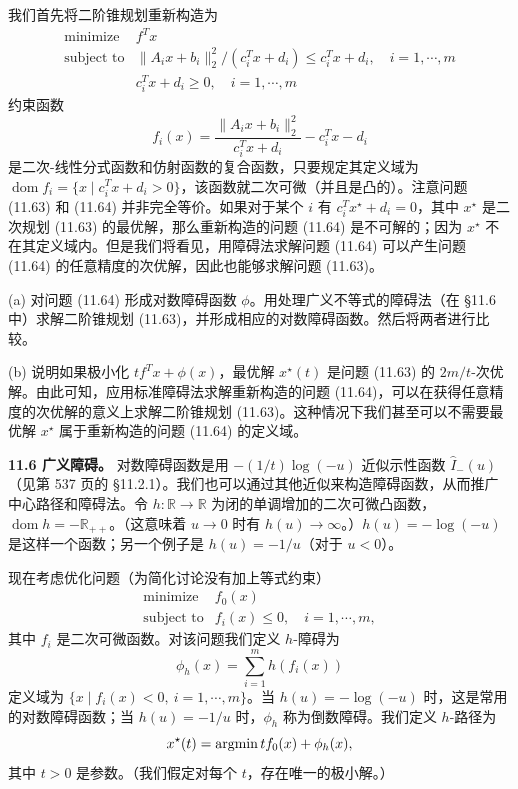 \documentclass[UTF8, 12pt, fontset=fandol, oneside]{ctexart}
\begin{document}
我们首先将二阶锥规划重新构造为
\begin{equation}
\begin{array}{ll}
\text{minimize} & f^Tx\\
\text{subject to} & \|A_ix+b_i\|_2^2/(c_i^Tx+d_i)\leq c_i^Tx+d_i,\quad i=1,\cdots,m\\
& c_i^Tx+d_i\geq 0,\quad i=1,\cdots,m
\end{array}
\tag{11.64}
\end{equation}
约束函数
\[
f_i(x)=\frac{\|A_ix+b_i\|_2^2}{c_i^Tx+d_i}-c_i^Tx-d_i
\]
是二次-线性分式函数和仿射函数的复合函数，只要规定其定义域为 $\operatorname{dom} f_i=\{x\mid c_i^Tx+d_i>0\}$，该函数就二次可微（并且是凸的）。注意问题 (11.63) 和 (11.64) 并非完全等价。如果对于某个 $i$ 有 $c_i^Tx^\star+d_i=0$，其中 $x^\star$ 是二次规划 (11.63) 的最优解，那么重新构造的问题 (11.64) 是不可解的；因为 $x^\star$ 不在其定义域内。但是我们将看见，用障碍法求解问题 (11.64) 可以产生问题 (11.64) 的任意精度的次优解，因此也能够求解问题 (11.63)。

(a) 对问题 (11.64) 形成对数障碍函数 $\phi$。用处理广义不等式的障碍法（在 \S11.6 中）求解二阶锥规划 (11.63)，并形成相应的对数障碍函数。然后将两者进行比较。

(b) 说明如果极小化 $tf^Tx+\phi(x)$，最优解 $x^\star(t)$ 是问题 (11.63) 的 $2m/t$-次优解。由此可知，应用标准障碍法求解重新构造的问题 (11.64)，可以在获得任意精度的次优解的意义上求解二阶锥规划 (11.63)。这种情况下我们甚至可以不需要最优解 $x^\star$ 属于重新构造的问题 (11.64) 的定义域。

\noindent\textbf{11.6 广义障碍。} 对数障碍函数是用 $-(1/t)\log(-u)$ 近似示性函数 $\hat{I}_-(u)$（见第 537 页的 \S11.2.1）。我们也可以通过其他近似来构造障碍函数，从而推广中心路径和障碍法。令 $h:\mathbb{R}\to\mathbb{R}$ 为闭的单调增加的二次可微凸函数，$\operatorname{dom}h=-\mathbb{R}_{++}$。（这意味着 $u\to 0$ 时有 $h(u)\to\infty$。）$h(u)=-\log(-u)$ 是这样一个函数；另一个例子是 $h(u)=-1/u$（对于 $u<0$）。

现在考虑优化问题（为简化讨论没有加上等式约束）
\[
\begin{array}{ll}
\text{minimize} & f_0(x)\\
\text{subject to} & f_i(x)\leq 0,\quad i=1,\cdots,m,
\end{array}
\]
其中 $f_i$ 是二次可微函数。对该问题我们定义 $h$-障碍为
\[
\phi_h(x)=\sum_{i=1}^m h(f_i(x))
\]
定义域为 $\{x\mid f_i(x)<0,\ i=1,\cdots,m\}$。当 $h(u)=-\log(-u)$ 时，这是常用的对数障碍函数；当 $h(u)=-1/u$ 时，$\phi_h$ 称为倒数障碍。我们定义 $h$-路径为
\[
x^\star(t)=\mathop{\rm argmin} tf_0(x)+\phi_h(x),
\]
其中 $t>0$ 是参数。（我们假定对每个 $t$，存在唯一的极小解。）
\end{document}

